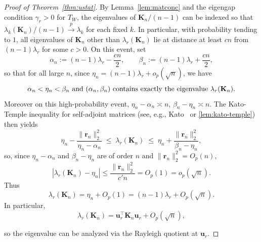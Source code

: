 \documentclass[11pt]{article}
\theoremstyle{plain}
\theoremstyle{remark}
\begin{document}
\begin{proof}[Proof of Theorem~\ref{thm:ustat}]
By Lemma~\ref{lem:matconc} and the eigengap condition $\gamma_r>0$ for $T_W$, the eigenvalues
of $\mathbf{K}_n/(n-1)$ can be indexed so that
$\lambda_k(\mathbf{K}_n)/(n-1)\xrightarrow{p}\lambda_k$ for each fixed $k$. In particular, with
probability tending to $1$, all eigenvalues of $\mathbf{K}_n$ other than $\lambda_r(\mathbf{K}_n)$
lie at distance at least $c n$ from $(n-1)\lambda_r$ for some $c>0$. On this event, set
\[
\alpha_n := (n-1)\lambda_r - \frac{c n}{2},\qquad
\beta_n := (n-1)\lambda_r + \frac{c n}{2},
\]
so that for all large $n$,
since $\eta_n=(n-1)\lambda_r+o_p(\sqrt{n})$, we have
\[
\alpha_n < \eta_n < \beta_n \text{\,\,and\,\,}
(\alpha_n,\beta_n)\ \text{contains exactly the eigenvalue } \lambda_r(\mathbf{K}_n).
\]
Moreover on this high-probability event, $\eta_n-\alpha_n\asymp n$, $\beta_n-\eta_n\asymp n$. The Kato-Temple inequality for
self-adjoint matrices (see, e.g., Kato~\citet{kato1966perturbation} or \ref{lem:kato-temple}) then yields
\[
\eta_n - \frac{\|\mathbf{r}_n\|_2^2}{\eta_n-\alpha_n}
\;\le\;
\lambda_r(\mathbf{K}_n)
\;\le\;
\eta_n + \frac{\|\mathbf{r}_n\|_2^2}{\beta_n-\eta_n},
\]
so, since $\eta_n-\alpha_n$ and $\beta_n-\eta_n$ are of order $n$ and
$\|\mathbf{r}_n\|_2^2=O_p(n)$,
\[
|\lambda_r(\mathbf{K}_n)-\eta_n|
\le
\frac{\|\mathbf{r}_n\|_2^2}{c'n}
=
O_p(1) = o_p(\sqrt n).
\]
Thus
\[
\lambda_r(\mathbf{K}_n)
=
\eta_n + O_p(1)
=
(n-1)\lambda_r + O_p(\sqrt n).
\] In particular,
\[ \lambda_r(\mathbf{K}_n) = \mathbf{u}_r^\top\mathbf{K}_n\mathbf{u}_r + O_p(\sqrt n), \]

so the eigenvalue can be analyzed via the Rayleigh quotient at $\mathbf{u}_r$.


\end{proof}
\end{document}
